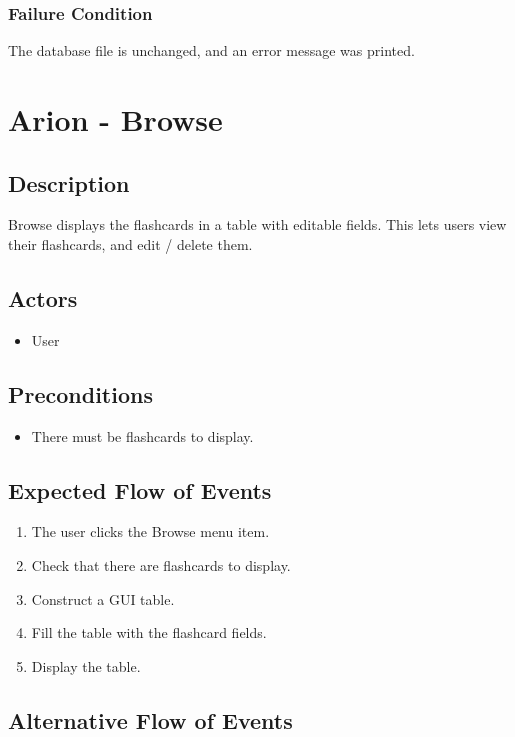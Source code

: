\documentclass{scrreprt}
\begin{document}
    \subsection{Failure Condition}
    The database file is unchanged, and an error message was printed.

\chapter{Arion - Browse}

\section{Description}
Browse displays the flashcards in a table with editable fields. This lets users
view their flashcards, and edit / delete them.

\section{Actors}
\begin{itemize}
    \item User
\end{itemize}

\section{Preconditions}
\begin{itemize}
    \item There must be flashcards to display.
\end{itemize}

\section{Expected Flow of Events}
\begin{enumerate}[1.]
    \item The user clicks the Browse menu item.
    \item Check that there are flashcards to display.
    \item Construct a GUI table.
    \item Fill the table with the flashcard fields.
    \item Display the table.
\end{enumerate}

\section{Alternative Flow of Events}
\end{document}

